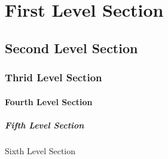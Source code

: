 \hypertarget{first-level-section}{%
\section{\texorpdfstring{\label{first-level-section}First Level
Section}{First Level Section}}\label{first-level-section}}

\hypertarget{second-level-section}{%
\subsection{\texorpdfstring{\label{second-level-section}Second Level
Section}{Second Level Section}}\label{second-level-section}}

\hypertarget{thrid-level-section}{%
\subsubsection{\texorpdfstring{\label{thrid-level-section}Thrid Level
Section}{Thrid Level Section}}\label{thrid-level-section}}

\hypertarget{fourth-level-section}{%
\paragraph{\texorpdfstring{\label{fourth-level-section}Fourth Level
Section}{Fourth Level Section}}\label{fourth-level-section}}

\hypertarget{fifth-level-section}{%
\subparagraph{\texorpdfstring{\label{fifth-level-section}Fifth Level
Section}{Fifth Level Section}}\label{fifth-level-section}}

\label{sixth-level-section}Sixth Level Section
